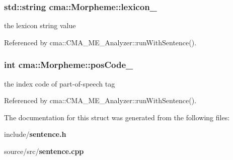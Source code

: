 \subsubsection{\setlength{\rightskip}{0pt plus 5cm}std::string {\bf cma::Morpheme::lexicon\_\-}}\label{structcma_1_1Morpheme_1054ad519e1ebb80ec71cd21b8ad2a78}


the lexicon string value 

Referenced by cma::CMA\_\-ME\_\-Analyzer::runWithSentence().
\subsubsection{\setlength{\rightskip}{0pt plus 5cm}int {\bf cma::Morpheme::posCode\_\-}}\label{structcma_1_1Morpheme_883d0df2e303ce7bd5953bfa913a88ef}


the index code of part-of-speech tag 

Referenced by cma::CMA\_\-ME\_\-Analyzer::runWithSentence().

The documentation for this struct was generated from the following files:\begin{CompactItemize}
\item 
include/{\bf sentence.h}\item 
source/src/{\bf sentence.cpp}\end{CompactItemize}
